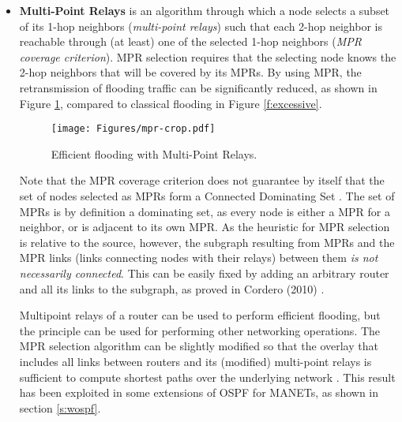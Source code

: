 \begin{itemize}
\item {\bf Multi-Point Relays} \cite{mpr-hicss2002} is an algorithm through which a node selects a subset of its 1-hop neighbors (\emph{multi-point relays}) such that each 2-hop neighbor is reachable through (at least) one of the selected 1-hop neighbors ({\em MPR coverage criterion}). MPR selection requires that the selecting node knows the 2-hop neighbors that will be covered by its MPRs. By using MPR, the retransmission of flooding traffic can be significantly reduced, as shown in Figure \ref{f:mpr}, compared to classical flooding in Figure \ref{f:excessive}. 

\begin{figure}[h]
\centering
\texttt{[image: Figures/mpr-crop.pdf]}
\caption{Efficient flooding with Multi-Point Relays.}
\label{f:mpr}
\end{figure}

	\begin{remark}
	Note that the MPR coverage criterion does not guarantee by itself that the set of nodes selected as MPRs form a Connected Dominating Set \cite{softcom10}. The set of MPRs is by definition a dominating set, as every node is either a MPR for a neighbor, or is adjacent to its own MPR. As the heuristic for MPR selection is relative to the source, however, the subgraph resulting from MPRs and the MPR links (links connecting nodes with their relays) between them {\em is not necessarily connected}. This can be easily fixed by adding an arbitrary router and all its links to the subgraph, as proved in Cordero (2010) \cite{softcom10}.
	\end{remark}


Multipoint relays of a router can be used to perform efficient flooding, but the principle can be used for performing other networking operations. The MPR selection algorithm can be slightly modified so that the overlay that includes all links between routers and its (modified) multi-point relays is sufficient to compute shortest paths over the underlying network \cite{softcom10}. This result has been exploited in some extensions of OSPF for MANETs, as shown in section \ref{s:wospf}.

\end{itemize}

